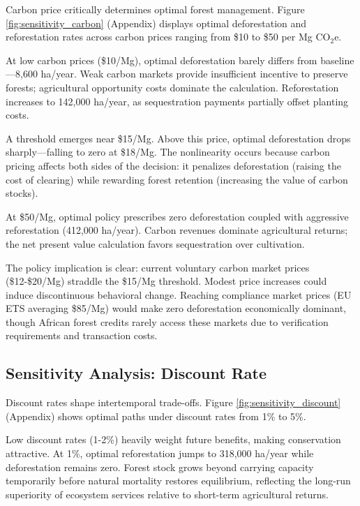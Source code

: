 Carbon price critically determines optimal forest management. Figure \ref{fig:sensitivity_carbon} (Appendix) displays optimal deforestation and reforestation rates across carbon prices ranging from \$10 to \$50 per Mg CO$_2$e.

At low carbon prices (\$10/Mg), optimal deforestation barely differs from baseline—8,600 ha/year. Weak carbon markets provide insufficient incentive to preserve forests; agricultural opportunity costs dominate the calculation. Reforestation increases to 142,000 ha/year, as sequestration payments partially offset planting costs.

A threshold emerges near \$15/Mg. Above this price, optimal deforestation drops sharply—falling to zero at \$18/Mg. The nonlinearity occurs because carbon pricing affects both sides of the decision: it penalizes deforestation (raising the cost of clearing) while rewarding forest retention (increasing the value of carbon stocks).

At \$50/Mg, optimal policy prescribes zero deforestation coupled with aggressive reforestation (412,000 ha/year). Carbon revenues dominate agricultural returns; the net present value calculation favors sequestration over cultivation.

The policy implication is clear: current voluntary carbon market prices (\$12-\$20/Mg) straddle the \$15/Mg threshold. Modest price increases could induce discontinuous behavioral change. Reaching compliance market prices (EU ETS averaging \$85/Mg) would make zero deforestation economically dominant, though African forest credits rarely access these markets due to verification requirements and transaction costs.

\subsection{Sensitivity Analysis: Discount Rate}

Discount rates shape intertemporal trade-offs. Figure \ref{fig:sensitivity_discount} (Appendix) shows optimal paths under discount rates from 1\% to 5\%.

Low discount rates (1-2\%) heavily weight future benefits, making conservation attractive. At 1\%, optimal reforestation jumps to 318,000 ha/year while deforestation remains zero. Forest stock grows beyond carrying capacity temporarily before natural mortality restores equilibrium, reflecting the long-run superiority of ecosystem services relative to short-term agricultural returns.

